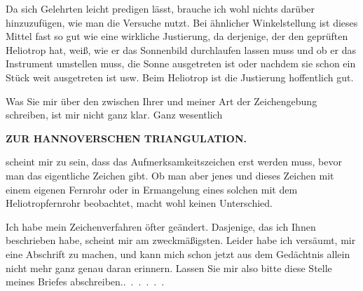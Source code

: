Da sich Gelehrten leicht predigen lässt, brauche ich wohl nichts darüber hinzuzufügen, wie man die Versuche nutzt.
Bei ähnlicher Winkelstellung ist dieses Mittel fast so gut wie eine wirkliche Justierung, da derjenige, der den geprüften Heliotrop hat, weiß, wie er das Sonnenbild durchlaufen lassen muss und ob er das Instrument umstellen muss,  die Sonne ausgetreten ist oder nachdem sie schon ein Stück weit ausgetreten ist usw.
Beim  Heliotrop ist die Justierung hoffentlich gut.
\par\noindent\hspace*{\parindent}Was Sie mir über den  zwischen Ihrer und meiner Art der Zeichengebung schreiben, ist mir nicht ganz klar.
Ganz wesentlich
\par\clearpage
\noindent\null\hfill{\small\textbf{ZUR HANNOVERSCHEN TRIANGULATION.}}\hfill{}\par\medskip
\noindent scheint mir zu sein, dass das Aufmerksamkeitszeichen erst  werden muss, bevor man das eigentliche Zeichen gibt. Ob man aber jenes und dieses Zeichen mit einem eigenen Fernrohr oder in Ermangelung eines solchen mit dem Heliotropfernrohr beobachtet, macht wohl keinen Unterschied.
\par\noindent\hspace*{\parindent}Ich habe mein Zeichenverfahren öfter geändert. Dasjenige, das ich Ihnen beschrieben habe, scheint mir am zweckmäßigsten.
Leider habe ich versäumt, mir eine Abschrift zu machen, und kann mich schon jetzt aus dem Gedächtnis allein nicht mehr ganz genau daran erinnern.
Lassen Sie mir also bitte diese Stelle meines Briefes \mbox{abschreiben.\quad.\ .\ .\ .\ .\ .}
\par
\endgroup
